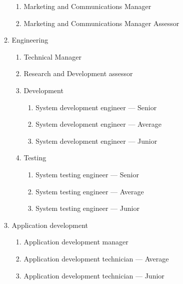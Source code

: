 \begin{enumerate}[label*=\arabic*.]
\begin{enumerate}[label*=\arabic*.]
		\begin{enumerate}[label*=\arabic*.]
			\item Marketing and Communications Manager
			\item Marketing and Communications Manager Assessor
		\end{enumerate}
		\item Engineering
		\begin{enumerate}[label*=\arabic*.]
			\item Technical Manager
			\item Research and Development assessor
			\item Development
			\begin{enumerate}[label*=\arabic*.]
				\item System development engineer --- Senior
				\item System development engineer --- Average
				\item System development engineer --- Junior
			\end{enumerate}
			\item Testing
			\begin{enumerate}[label*=\arabic*.]
				\item System testing engineer --- Senior
				\item System testing engineer --- Average
				\item System testing engineer --- Junior
			\end{enumerate}
		\end{enumerate}
		\item Application development
		\begin{enumerate}[label*=\arabic*.]
			\item Application development manager
			\item Application development technician --- Average
			\item Application development technician --- Junior
		\end{enumerate}
	\end{enumerate}
	

\end{enumerate}
